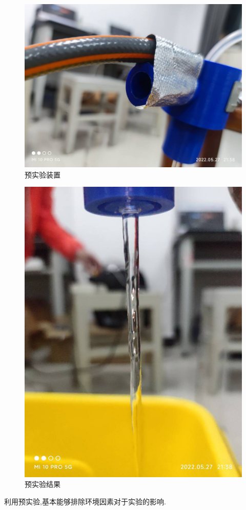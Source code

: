 \documentclass[UTF8]{gapd}
\begin{document}
\begin{figure}[H]
	\centering
	\includegraphics[width=0.8\linewidth]{images/预实验1}
	\caption{预实验装置}
	\label{fig:P18}
\end{figure}
\begin{figure}[H]
	\centering
	\includegraphics[width=0.8\linewidth,height=0.2\textheight]{images/预实验结果}
	\caption{预实验结果}
	\label{fig:P19}
\end{figure}

利用预实验,基本能够排除环境因素对于实验的影响.
\end{document}

